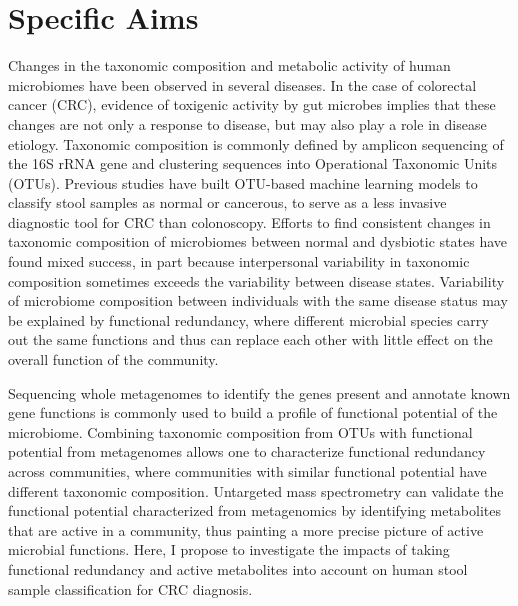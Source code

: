\section*{Specific Aims} %

Changes in the taxonomic composition and metabolic activity of human microbiomes have been observed in several diseases.
In the case of colorectal cancer (CRC), evidence of toxigenic activity by gut microbes implies that these changes are not only a response to disease, but may also play a role in disease etiology.
Taxonomic composition is commonly defined by amplicon sequencing of the 16S rRNA gene and clustering sequences into Operational Taxonomic Units (OTUs).
Previous studies have built OTU-based machine learning models to classify stool samples as normal or cancerous, to serve as a less invasive diagnostic tool for CRC than colonoscopy.
Efforts to find consistent changes in taxonomic composition of microbiomes between normal and dysbiotic states have found mixed success, in part because interpersonal variability in taxonomic composition sometimes exceeds the variability between disease states.
Variability of microbiome composition between individuals with the same disease status may be explained by functional redundancy, where different microbial species carry out the same functions and thus can replace each other with little effect on the overall function of the community.

Sequencing whole metagenomes to identify the genes present and annotate known gene functions is commonly used to build a profile of functional potential of the microbiome.
Combining taxonomic composition from OTUs with functional potential from metagenomes allows one to characterize functional redundancy across communities, where communities with similar functional potential have different taxonomic composition.
Untargeted mass spectrometry can validate the functional potential characterized from metagenomics by identifying metabolites that are active in a community, thus painting a more precise picture of active microbial functions.
Here, I propose to investigate the impacts of taking functional redundancy and active metabolites into account on human stool sample classification for CRC diagnosis.

